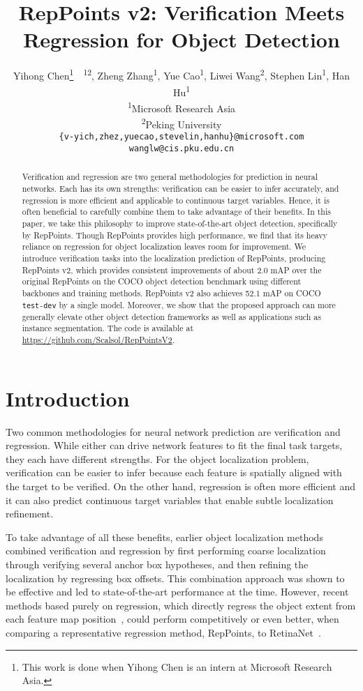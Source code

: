 \documentclass{article}
\title{RepPoints v2: Verification Meets Regression for Object Detection}
\author{Yihong Chen\thanks{This work is done when Yihong Chen is an intern at Microsoft Research Asia.}~~\textsuperscript{12}, Zheng Zhang\textsuperscript{1}, Yue Cao\textsuperscript{1}, Liwei Wang\textsuperscript{2}, Stephen Lin\textsuperscript{1}, Han Hu\textsuperscript{1}\\
  \textsuperscript{1}Microsoft Research Asia\\
  \textsuperscript{2}Peking University\\
  \texttt{\{v-yich,zhez,yuecao,stevelin,hanhu\}@microsoft.com} \\
  \texttt{wanglw@cis.pku.edu.cn}
}
\begin{document}
\maketitle

\begin{abstract}

Verification and regression are two general methodologies for prediction in neural networks. Each has its own strengths: verification can be easier to infer accurately, and regression is more efficient and applicable to continuous target variables. Hence, it is often beneficial to carefully combine them to take advantage of their benefits. In this paper, we take this philosophy to improve state-of-the-art object detection, specifically by RepPoints. Though RepPoints provides high performance, we find that its heavy reliance on regression for object localization leaves room for improvement. We introduce verification tasks into the localization prediction of RepPoints, producing RepPoints v2, which provides consistent improvements of about 2.0 mAP over the original RepPoints on the COCO object detection benchmark using different backbones and training methods. RepPoints v2 also achieves 52.1 mAP on COCO \texttt{test-dev} by a single model. Moreover, we show that the proposed approach can more generally elevate other object detection frameworks as well as applications such as instance segmentation. The code is available at \url{https://github.com/Scalsol/RepPointsV2}.

\end{abstract}

\section{Introduction}

Two common methodologies for neural network prediction are verification and regression. While either can drive network features to fit the final task targets, they each have different strengths. For the object localization problem, verification can be easier to infer because each feature is spatially aligned with the target to be verified. On the other hand, regression is often more efficient and it can also predict continuous target variables that enable subtle localization refinement.

To take advantage of all these benefits, earlier object localization methods~\cite{rbg15fastrcnn,SSD,RetinaNet} combined verification and regression by first performing coarse localization through verifying several anchor box hypotheses, and then refining the localization by regressing box offsets. This combination approach was shown to be effective and led to state-of-the-art performance at the time. However, recent methods based purely on regression, which directly regress the object extent from each feature map position~\cite{yang19reppts,tian2019fcos,zhang2019atss}, could perform competitively or even better, when comparing a representative regression method, RepPoints, to RetinaNet~\cite{RetinaNet}.
\end{document}
